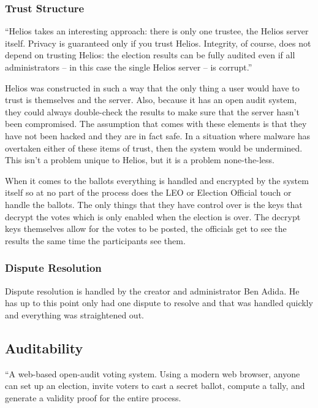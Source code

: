 \subsubsection{Trust Structure}

``Helios takes an interesting approach: there is only one trustee, the Helios server itself. Privacy is guaranteed only if you trust Helios. Integrity, of course, does not depend on trusting Helios: the election results can be fully audited even if all administrators -- in this case the single Helios server -- is corrupt.''~\cite{adida2008}

Helios was constructed in such a way that the only thing a user would have to trust is themselves and the server. Also, because it has an open audit system, they could always double-check the results to make sure that the server hasn't been compromised. The assumption that comes with these elements is that they have not been hacked and they are in fact safe. In a situation where malware has overtaken either of these items of trust, then the system would be undermined. This isn't a problem unique to Helios, but it is a problem none-the-less.

When it comes to the ballots everything is handled and encrypted by the system itself so at no part of the process does the LEO or Election Official touch or handle the ballots. The only things that they have control over is the keys that decrypt the votes which is only enabled when the election is over. The decrypt keys themselves allow for the votes to be posted, the officials get to see the results the same time the participants see them.

\subsubsection{Dispute Resolution}

Dispute resolution is handled by the creator and administrator Ben Adida. He has up to this point only had one dispute to resolve and that was handled quickly and everything was straightened out.

\subsection{Auditability}

``A web-based open-audit voting system. Using a modern web browser, anyone can set up an election, invite voters to cast a secret ballot, compute a tally, and generate a validity proof for the entire process.

